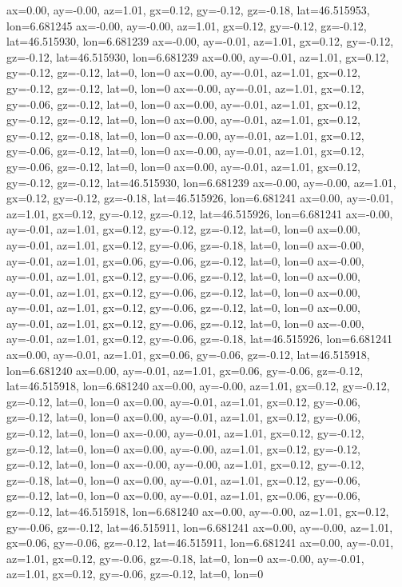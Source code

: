 ax=0.00, ay=-0.00, az=1.01, gx=0.12, gy=-0.12, gz=-0.18, lat=46.515953, lon=6.681245
ax=-0.00, ay=-0.00, az=1.01, gx=0.12, gy=-0.12, gz=-0.12, lat=46.515930, lon=6.681239
ax=-0.00, ay=-0.01, az=1.01, gx=0.12, gy=-0.12, gz=-0.12, lat=46.515930, lon=6.681239
ax=0.00, ay=-0.01, az=1.01, gx=0.12, gy=-0.12, gz=-0.12, lat=0, lon=0
ax=0.00, ay=-0.01, az=1.01, gx=0.12, gy=-0.12, gz=-0.12, lat=0, lon=0
ax=-0.00, ay=-0.01, az=1.01, gx=0.12, gy=-0.06, gz=-0.12, lat=0, lon=0
ax=0.00, ay=-0.01, az=1.01, gx=0.12, gy=-0.12, gz=-0.12, lat=0, lon=0
ax=0.00, ay=-0.01, az=1.01, gx=0.12, gy=-0.12, gz=-0.18, lat=0, lon=0
ax=-0.00, ay=-0.01, az=1.01, gx=0.12, gy=-0.06, gz=-0.12, lat=0, lon=0
ax=-0.00, ay=-0.01, az=1.01, gx=0.12, gy=-0.06, gz=-0.12, lat=0, lon=0
ax=0.00, ay=-0.01, az=1.01, gx=0.12, gy=-0.12, gz=-0.12, lat=46.515930, lon=6.681239
ax=-0.00, ay=-0.00, az=1.01, gx=0.12, gy=-0.12, gz=-0.18, lat=46.515926, lon=6.681241
ax=0.00, ay=-0.01, az=1.01, gx=0.12, gy=-0.12, gz=-0.12, lat=46.515926, lon=6.681241
ax=-0.00, ay=-0.01, az=1.01, gx=0.12, gy=-0.12, gz=-0.12, lat=0, lon=0
ax=0.00, ay=-0.01, az=1.01, gx=0.12, gy=-0.06, gz=-0.18, lat=0, lon=0
ax=-0.00, ay=-0.01, az=1.01, gx=0.06, gy=-0.06, gz=-0.12, lat=0, lon=0
ax=-0.00, ay=-0.01, az=1.01, gx=0.12, gy=-0.06, gz=-0.12, lat=0, lon=0
ax=0.00, ay=-0.01, az=1.01, gx=0.12, gy=-0.06, gz=-0.12, lat=0, lon=0
ax=0.00, ay=-0.01, az=1.01, gx=0.12, gy=-0.06, gz=-0.12, lat=0, lon=0
ax=0.00, ay=-0.01, az=1.01, gx=0.12, gy=-0.06, gz=-0.12, lat=0, lon=0
ax=-0.00, ay=-0.01, az=1.01, gx=0.12, gy=-0.06, gz=-0.18, lat=46.515926, lon=6.681241
ax=0.00, ay=-0.01, az=1.01, gx=0.06, gy=-0.06, gz=-0.12, lat=46.515918, lon=6.681240
ax=0.00, ay=-0.01, az=1.01, gx=0.06, gy=-0.06, gz=-0.12, lat=46.515918, lon=6.681240
ax=0.00, ay=-0.00, az=1.01, gx=0.12, gy=-0.12, gz=-0.12, lat=0, lon=0
ax=0.00, ay=-0.01, az=1.01, gx=0.12, gy=-0.06, gz=-0.12, lat=0, lon=0
ax=0.00, ay=-0.01, az=1.01, gx=0.12, gy=-0.06, gz=-0.12, lat=0, lon=0
ax=-0.00, ay=-0.01, az=1.01, gx=0.12, gy=-0.12, gz=-0.12, lat=0, lon=0
ax=0.00, ay=-0.00, az=1.01, gx=0.12, gy=-0.12, gz=-0.12, lat=0, lon=0
ax=-0.00, ay=-0.00, az=1.01, gx=0.12, gy=-0.12, gz=-0.18, lat=0, lon=0
ax=0.00, ay=-0.01, az=1.01, gx=0.12, gy=-0.06, gz=-0.12, lat=0, lon=0
ax=0.00, ay=-0.01, az=1.01, gx=0.06, gy=-0.06, gz=-0.12, lat=46.515918, lon=6.681240
ax=0.00, ay=-0.00, az=1.01, gx=0.12, gy=-0.06, gz=-0.12, lat=46.515911, lon=6.681241
ax=0.00, ay=-0.00, az=1.01, gx=0.06, gy=-0.06, gz=-0.12, lat=46.515911, lon=6.681241
ax=0.00, ay=-0.01, az=1.01, gx=0.12, gy=-0.06, gz=-0.18, lat=0, lon=0
ax=-0.00, ay=-0.01, az=1.01, gx=0.12, gy=-0.06, gz=-0.12, lat=0, lon=0
